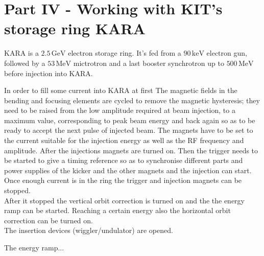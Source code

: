 \section{Part IV - Working with KIT's storage ring KARA}
KARA is a $2.5\,\mathrm{GeV}$ electron storage ring. It's fed from a $90\,\mathrm{keV}$ electron gun, followed by a $53\,\mathrm{MeV}$ mictrotron and a last booster synchrotron up to $500\,\mathrm{MeV}$ before injection into KARA.
\par
In order to fill some current into KARA at first 
The magnetic fields in the bending and focusing elements are cycled to remove the magnetic hysteresis; they need to be raised from the low amplitude required at beam injection, to a maximum value, corresponding to peak beam energy and back again so as to be ready to accept the next pulse of injected beam.
The magnets have to be set to the current suitable for the injection energy as well as the RF frequency and amplitude.
After the injections magnets are turned on.
Then the trigger needs to be started to give a timing reference so as to synchronise different parts and power supplies of the kicker and the other magnets and the injection can start. 
Once enough current is in the ring the trigger and injection magnets can be stopped.\\
After it stopped the vertical orbit correction is turned on and the the energy ramp can be started. 
Reaching a certain energy also the horizontal orbit correction can be turned on.\\
The insertion devices (wiggler/undulator) are opened.
\par
The energy ramp...
\par

